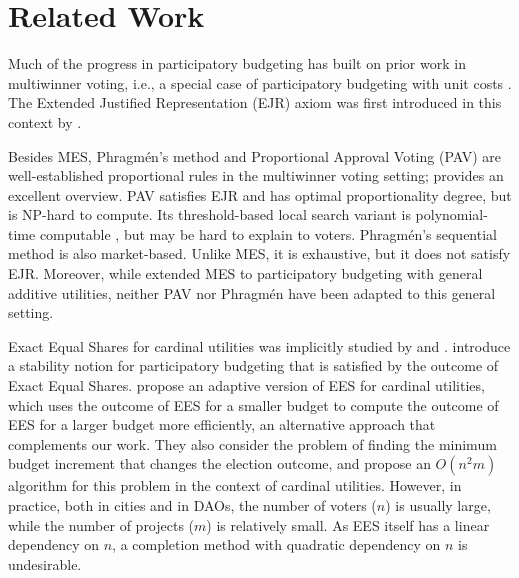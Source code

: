 \section{Related Work}
Much of the progress in participatory budgeting has built on prior work in multiwinner voting, i.e.,
a special case of participatory budgeting with unit costs \citep{lackner2023approval}.
The Extended Justified Representation (EJR) axiom was first introduced in this context by \citet{aziz2017justified}.

Besides MES, Phragm\'en's method \citep{phragmen:p1} and Proportional Approval Voting (PAV) \citep{thiele} are well-established proportional rules in the multiwinner voting setting; \citet{janson2016phragmen} provides
an excellent overview.
PAV satisfies EJR \citep{aziz2017justified} and has optimal proportionality degree, but is NP-hard to compute. Its threshold-based local search variant 
is polynomial-time computable  \citep{ejr,kraiczy2023properties}, but may be hard to explain to voters. 
Phragm\'en's sequential method is also market-based.
Unlike MES, it is exhaustive, but it does not satisfy EJR. %
Moreover, while \citet{MES2} extended
MES to participatory budgeting with general additive utilities, neither PAV nor Phragm\'en have been adapted to this general setting.

Exact Equal Shares for cardinal utilities was implicitly studied by \citet{peters2021market} and \citet{kraiczy2023adaptive}.
\citet{peters2021market} introduce a stability notion for participatory budgeting that is satisfied by the outcome of Exact Equal Shares. \citet{kraiczy2023adaptive} propose an adaptive version of EES for cardinal utilities, which uses the outcome of EES for a smaller budget to compute the outcome of EES for a larger budget more efficiently, an alternative approach that complements our work.
They also consider the problem of finding the minimum budget increment that changes the election outcome, and propose an $O(n^2m)$ algorithm for this problem in the context of cardinal utilities. However, in practice, both in cities and in DAOs, the number of voters ($n$) is usually large, while the number of projects ($m$) is relatively small. As EES itself has a linear dependency on $n$, a completion method with quadratic dependency on $n$ is undesirable.


